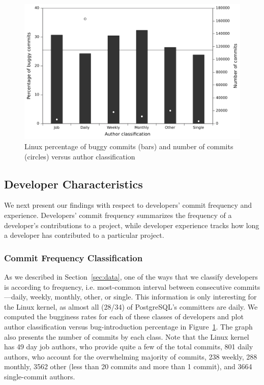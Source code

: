 \begin{figure}[t!hb]
\begin{center}
\includegraphics[width=\columnwidth]{linux-bugginess-author-class.pdf}
\end{center}
\caption{\label{fig-linux-bugginess-author-class}Linux percentage of buggy
 commits (bars) and number of commits (circles) versus author classification}
\end{figure}

\subsection{Developer Characteristics}
\label{sec-dev-char}

We next present our findings with respect to developers' commit frequency and
experience. Developers' commit frequency summarizes the frequency
of a developer's contributions to a project, while developer experience tracks
how long a developer has contributed to a particular project.

\subsubsection{Commit Frequency Classification} 

As we described in Section~\ref{sec:data}, one of the ways that we classify
developers is according to frequency, i.e. most-common interval between
consecutive commits---daily, weekly, monthly, other, or single. This
information is only interesting for the Linux kernel, as almost all (28/34) of
PostgreSQL's committers are daily. We computed the bugginess rates for each of
these classes of developers and plot author classification versus
bug-introduction percentage in
Figure~\ref{fig-linux-bugginess-author-class}. The graph also presents the
number of commits by each class. Note that the Linux kernel has 49 day job
authors, who provide quite a few of the total commits, 801 daily authors, who
account for the overwhelming majority of commits, 238 weekly, 288 monthly, 3562
other (less than 20 commits and more than 1 commit), and 3664 single-commit authors.

